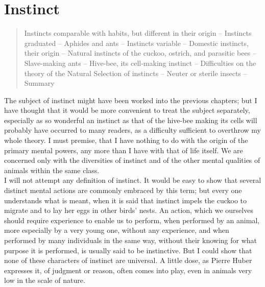 \chapter{Instinct}

\begin{quotation}
Instincts comparable with habits, but different in their origin -- Instincts graduated -- Aphides and ants -- Instincts variable -- Domestic instincts, their origin -- Natural instincts of the cuckoo, ostrich, and parasitic bees -- Slave-making ants -- Hive-bee, its cell-making instinct -- Difficulties on the theory of the Natural Selection of instincts -- Neuter or sterile insects -- Summary
\end{quotation}

\indent The subject of instinct might have been worked into the previous chapters; but I have thought that it would be more convenient to treat the subject separately, especially as so wonderful an instinct as that of the hive-bee making its cells will probably have occurred to many readers, as a difficulty sufficient to overthrow my whole theory. I must premise, that I have nothing to do with the origin of the primary mental powers, any more than I have with that of life itself. We are concerned only with the diversities of instinct and of the other mental qualities of animals within the same class.\\
\indent I will not attempt any definition of instinct. It would be easy to show that several distinct mental actions are commonly embraced by this term; but every one understands what is meant, when it is said that instinct impels the cuckoo to migrate and to lay her eggs in other birds' nests.  An action, which we ourselves should require experience to enable us to perform, when performed by an animal, more especially by a very young one, without any experience, and when performed by many individuals in the same way, without their knowing for what purpose it is performed, is usually said to be instinctive. But I could show that none of these characters of instinct are universal. A little dose, as Pierre Huber expresses it, of judgment or reason, often comes into play, even in animals very low in the scale of nature.\\
